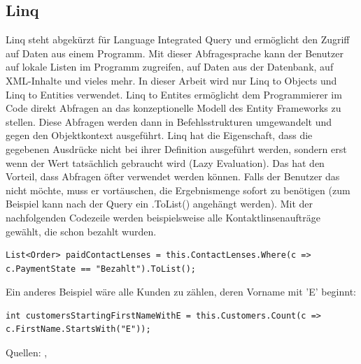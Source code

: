 \subsection{Linq}
Linq steht abgekürzt für Language Integrated Query und ermöglicht den Zugriff auf Daten aus einem Programm. Mit dieser Abfragesprache kann der Benutzer auf lokale Listen im Programm zugreifen, auf Daten aus der Datenbank, auf XML-Inhalte und vieles mehr. In dieser Arbeit wird nur Linq to Objects und Linq to Entities verwendet. Linq to Entites ermöglicht dem Programmierer im Code direkt Abfragen an das konzeptionelle Modell des Entity Frameworks zu stellen. Diese Abfragen werden dann in Befehlsstrukturen umgewandelt und gegen den Objektkontext ausgeführt.
\newline Linq hat die Eigenschaft, dass die gegebenen Ausdrücke nicht bei ihrer Definition ausgeführt werden, sondern erst wenn der Wert tatsächlich gebraucht wird (Lazy Evaluation). Das hat den Vorteil, dass Abfragen öfter verwendet werden können. Falls der Benutzer das nicht möchte, muss er vortäuschen, die Ergebnismenge sofort zu benötigen (zum Beispiel kann nach der Query ein .ToList() angehängt werden).
\newline Mit der nachfolgenden Codezeile werden beispielsweise alle Kontaktlinsenaufträge gewählt, die schon bezahlt wurden.
\begin{lstlisting}
List<Order> paidContactLenses = this.ContactLenses.Where(c => c.PaymentState == "Bezahlt").ToList();
\end{lstlisting}
Ein anderes Beispiel wäre alle Kunden zu zählen, deren Vorname mit 'E' beginnt:
\begin{lstlisting}
int customersStartingFirstNameWithE = this.Customers.Count(c => c.FirstName.StartsWith("E"));
\end{lstlisting}
Quellen: \cite{wikipedia_linq_2018}, \cite{microsoft_linq_2018}

